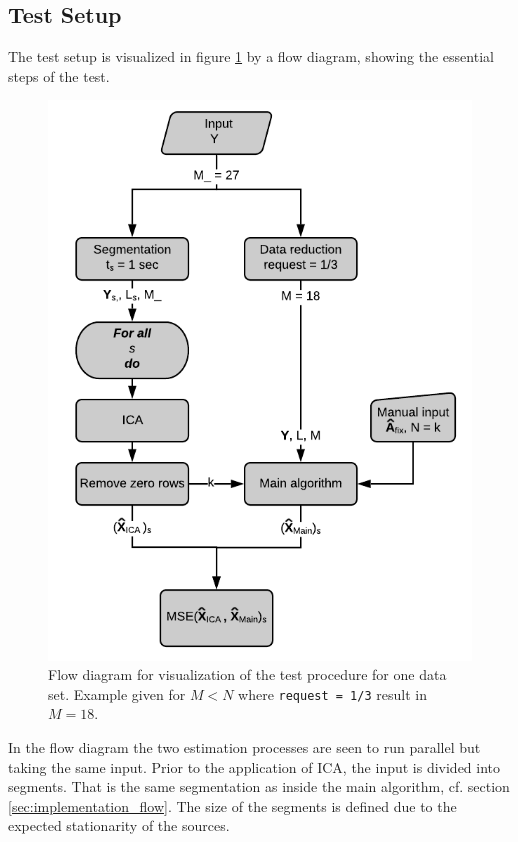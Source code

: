 \subsection{Test Setup}
The test setup is visualized in figure \ref{fig:flow2} by a flow diagram, showing the essential steps of the test. 
\begin{figure}[H]
    \centering
	\includegraphics[scale=1]{figures/ch_7/flow2.png}
	\caption{Flow diagram for visualization of the test procedure for one data set. Example given for $M < N$ where \texttt{request = 1/3} result in $M = 18$.}
	\label{fig:flow2}
\end{figure}
\noindent
In the flow diagram the two estimation processes are seen to run parallel but taking the same input. 
Prior to the application of ICA, the input is divided into segments. 
That is the same segmentation as inside the main algorithm, cf. section \ref{sec:implementation_flow}.
The size of the segments is defined due to the expected stationarity of the sources. 
